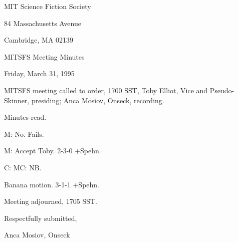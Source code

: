 \documentclass[12pt]{article}
\begin{document}
\begin{center}

MIT Science Fiction Society 

84 Massachusetts Avenue

Cambridge, MA 02139

\vspace{12pt}

MITSFS Meeting Minutes 

Friday, March 31, 1995

\end{center}
 
\vspace{18pt}

\setlength{\parskip}{6pt}

\noindent
MITSFS meeting called to order, 1700 SST,
Toby Elliot, Vice and Pseudo-Skinner, presiding; Anca Mosiov, Onseck, recording.

Minutes read.

M: No. Fails.

M: Accept Toby. 2-3-0 +Spehn.

C: MC: NB.

Banana motion. 3-1-1 +Spehn.

\vspace{12pt}

\noindent
Meeting adjourned, 1705 SST.

\vspace{18pt}

\centerline{Respectfully submitted,}
\centerline{Anca Mosiov, Onseck}
\end{document}
